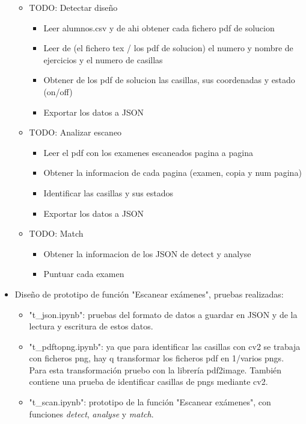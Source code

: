 \begin{itemize}
\begin{itemize}
        \item TODO: Detectar diseño
        \begin{itemize}
            \item Leer alumnos.csv y de ahi obtener cada fichero pdf de solucion
            \item Leer de (el fichero tex / los pdf de solucion) el numero y nombre de ejercicios y el numero de casillas
            \item Obtener de los pdf de solucion las casillas, sus coordenadas y estado (on/off)
            \item Exportar los datos a JSON
        \end{itemize}
        \item TODO: Analizar escaneo
        \begin{itemize}
            \item Leer el pdf con los examenes escaneados pagina a pagina
            \item Obtener la informacion de cada pagina (examen, copia y num pagina)
            \item Identificar las casillas y sus estados
            \item Exportar los datos a JSON
        \end{itemize}
        \item TODO: Match
        \begin{itemize}
            \item Obtener la informacion de los JSON de detect y analyse
            \item Puntuar cada examen
        \end{itemize}
    \end{itemize}
    \item Diseño de prototipo de función "Escanear exámenes", pruebas realizadas:
    \begin{itemize}
        \item "t\_json.ipynb": pruebas del formato de datos a guardar en JSON y de la lectura y escritura de estos datos.
        \item "t\_pdftopng.ipynb": ya que para identificar las casillas con cv2 se trabaja con ficheros png, hay q transformar los ficheros pdf en 1/varios pngs. Para esta transformación pruebo con la librería pdf2image. También contiene una prueba de identificar casillas de pngs mediante cv2.
        \item "t\_scan.ipynb": prototipo de la función "Escanear exámenes", con funciones \textit{detect}, \textit{analyse} y \textit{match}.

\end{itemize}
\end{itemize}
